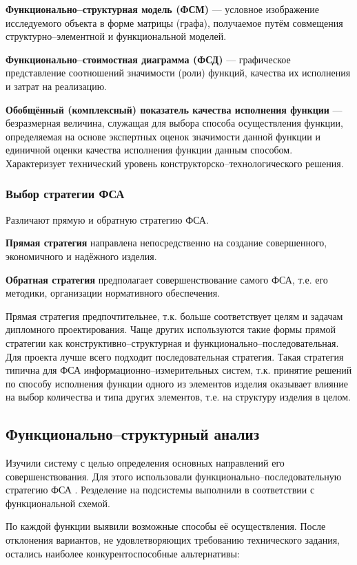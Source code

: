 \textbf{Функционально--структурная модель (ФСМ)} --- условное изображение
исследуемого объекта в форме матрицы (графа),
получаемое путём совмещения структурно--элементной и функциональной моделей.

\textbf{Функционально--стоимостная диаграмма (ФСД)} --- графическое
представление соотношений значимости (роли) функций, качества их
исполнения и затрат на реализацию.

\textbf{Обобщённый (комплексный) показатель качества исполнения функции}
--- безразмерная величина, служащая для выбора способа осуществления функции,
определяемая на основе экспертных оценок значимости данной функции и единичной
оценки качества исполнения функции данным способом.
Характеризует технический уровень конструкторско--технологического решения.

\subsubsection{Выбор стратегии ФСА}
Различают прямую и обратную стратегию ФСА.

\textbf{Прямая стратегия}
направлена непосредственно на создание совершенного, экономичного и надёжного
изделия.

\textbf{Обратная стратегия}
предполагает совершенствование самого ФСА, т.е. его методики, организации
нормативного обеспечения.

Прямая стратегия предпочтительнее, т.к. больше соответствует целям и задачам
дипломного проектирования.
Чаще других используются такие формы прямой стратегии как
конструктивно--структурная и функционально--последовательная.
Для проекта лучше всего подходит последовательная стратегия.
Такая стратегия типична для ФСА информационно--измерительных систем, т.к.
принятие решений по способу исполнения функции одного из элементов изделия
оказывает влияние на выбор количества и типа других элементов, т.е. на структуру
изделия в целом.

\newpage
\subsection{Функционально--структурный анализ}
Изучили систему с целью определения основных направлений его совершенствования.
Для этого использовали функционально--последовательную стратегию ФСА
\cite[стр. 11]{econ_FSA}.
Резделение на подсистемы выполнили в соответствии с функциональной схемой.

По каждой функции выявили возможные способы её осуществления.
После отклонения вариантов, не удовлетворяющих требованию технического
задания, остались наиболее конкурентоспособные альтернативы:

